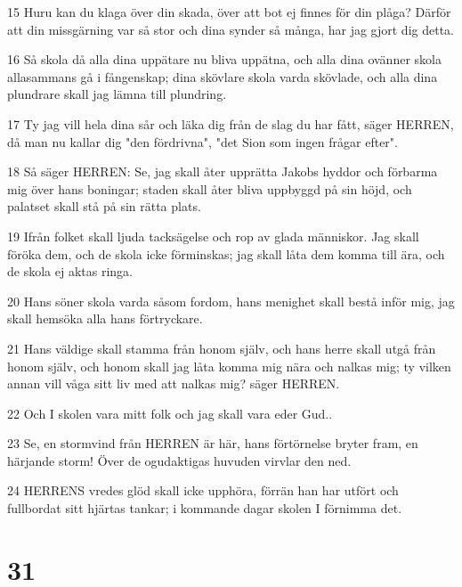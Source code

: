 \par 15 Huru kan du klaga över din skada, över att bot ej finnes för din plåga? Därför att din missgärning var så stor och dina synder så många, har jag gjort dig detta.
\par 16 Så skola då alla dina uppätare nu bliva uppätna, och alla dina ovänner skola allasammans gå i fångenskap; dina skövlare skola varda skövlade, och alla dina plundrare skall jag lämna till plundring.
\par 17 Ty jag vill hela dina sår och läka dig från de slag du har fått, säger HERREN, då man nu kallar dig "den fördrivna", "det Sion som ingen frågar efter".
\par 18 Så säger HERREN: Se, jag skall åter upprätta Jakobs hyddor och förbarma mig över hans boningar; staden skall åter bliva uppbyggd på sin höjd, och palatset skall stå på sin rätta plats.
\par 19 Ifrån folket skall ljuda tacksägelse och rop av glada människor. Jag skall föröka dem, och de skola icke förminskas; jag skall låta dem komma till ära, och de skola ej aktas ringa.
\par 20 Hans söner skola varda såsom fordom, hans menighet skall bestå inför mig, jag skall hemsöka alla hans förtryckare.
\par 21 Hans väldige skall stamma från honom själv, och hans herre skall utgå från honom själv, och honom skall jag låta komma mig nära och nalkas mig; ty vilken annan vill våga sitt liv med att nalkas mig? säger HERREN.
\par 22 Och I skolen vara mitt folk och jag skall vara eder Gud..
\par 23 Se, en stormvind från HERREN är här, hans förtörnelse bryter fram, en härjande storm! Över de ogudaktigas huvuden virvlar den ned.
\par 24 HERRENS vredes glöd skall icke upphöra, förrän han har utfört och fullbordat sitt hjärtas tankar; i kommande dagar skolen I förnimma det.

\chapter{31}

